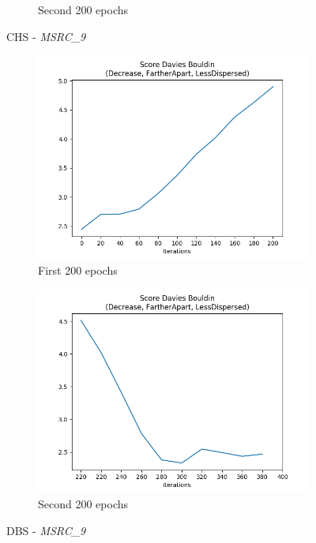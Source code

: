 \begin{figure}[!ht]
\begin{subfigure}{0.49\textwidth}
				\caption{Second 200 epochs}
				\label{fig:plote6chsmsrc9egdl2200h-05mexp3pullpush}
			\end{subfigure}
			\caption{CHS - \textit{MSRC\_9}}
			\label{fig:E6CHS}
		\end{figure}
	
		\begin{figure}[!ht]
			\centering
			\begin{subfigure}{0.49\textwidth}
				\centering
				\includegraphics[width=1.1\linewidth]{images/plotE6_DBS_MSRC_9_E_GDL_22_00h-05mExp3pull}
				\caption{First 200 epochs}
				\label{fig:plote6dbsmsrc9egdl2200h-05mexp3pull}
			\end{subfigure}
			\begin{subfigure}{0.49\textwidth}
				\centering
				\includegraphics[width=1.1\linewidth]{images/plotE6_DBS_MSRC_9_E_GDL_22_00h-05mExp3pullpush}
				\caption{Second 200 epochs}
				\label{fig:plote6dbsmsrc9egdl2200h-05mexp3pullpush}
			\end{subfigure}
			\caption{DBS - \textit{MSRC\_9}}
			\label{fig:E6DBS}
		\end{figure}
	

